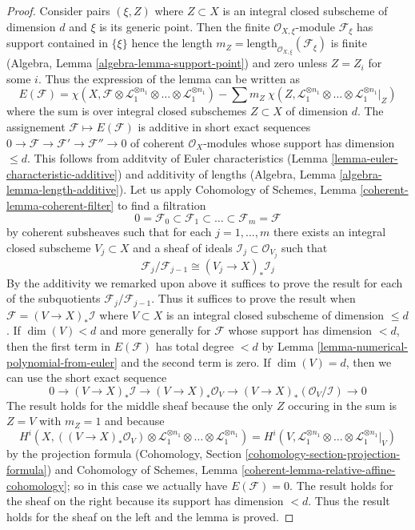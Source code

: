 \begin{proof}
Consider pairs $(\xi , Z)$ where $Z \subset X$ is an integral
closed subscheme of dimension $d$ and $\xi$ is its generic point.
Then the finite $\mathcal{O}_{X, \xi}$-module $\mathcal{F}_\xi$
has support contained in $\{\xi\}$ hence the length
$m_Z = \text{length}_{\mathcal{O}_{X, \xi}}(\mathcal{F}_\xi)$
is finite (Algebra, Lemma \ref{algebra-lemma-support-point})
and zero unless $Z = Z_i$ for some $i$. Thus the expression
of the lemma can be written as
$$
E(\mathcal{F}) =
\chi(X, \mathcal{F} \otimes \mathcal{L}_1^{\otimes n_1} \otimes \ldots \otimes
\mathcal{L}_1^{\otimes n_1}) -
\sum\nolimits
m_Z\ \chi(Z, \mathcal{L}_1^{\otimes n_1} \otimes \ldots \otimes
\mathcal{L}_1^{\otimes n_1}|_Z)
$$
where the sum is over integral closed subschemes $Z \subset X$
of dimension $d$. The assignement $\mathcal{F} \mapsto E(\mathcal{F})$
is additive in short exact sequences
$0 \to \mathcal{F} \to \mathcal{F}' \to \mathcal{F}'' \to 0$
of coherent $\mathcal{O}_X$-modules whose support has dimension
$\leq d$. This follows from additvity of Euler characteristics
(Lemma \ref{lemma-euler-characteristic-additive})
and additivity of lengths
(Algebra, Lemma \ref{algebra-lemma-length-additive}).
Let us apply Cohomology of Schemes, Lemma \ref{coherent-lemma-coherent-filter}
to find a filtration
$$
0 = \mathcal{F}_0 \subset \mathcal{F}_1 \subset
\ldots \subset \mathcal{F}_m = \mathcal{F}
$$
by coherent subsheaves such that for each $j = 1, \ldots, m$
there exists an integral closed subscheme $V_j \subset X$
and a sheaf of ideals $\mathcal{I}_j \subset \mathcal{O}_{V_j}$
such that
$$
\mathcal{F}_j/\mathcal{F}_{j - 1}
\cong (V_j \to X)_* \mathcal{I}_j
$$
By the additivity we remarked upon above it suffices to
prove the result for each of the subquotients
$\mathcal{F}_j/\mathcal{F}_{j - 1}$. Thus it suffices to prove
the result when $\mathcal{F} = (V \to X)_*\mathcal{I}$ where
$V \subset X$ is an integral closed subscheme of dimension $\leq d$.
If $\dim(V) < d$ and more generally for $\mathcal{F}$
whose support has dimension $< d$, then the first term
in $E(\mathcal{F})$ has total degree $< d$ by
Lemma \ref{lemma-numerical-polynomial-from-euler}
and the second term is zero. If $\dim(V) = d$, then we can use the
short exact sequence
$$
0 \to (V \to X)_*\mathcal{I} \to (V \to X)_*\mathcal{O}_V
\to (V \to X)_*(\mathcal{O}_V/\mathcal{I}) \to 0
$$
The result holds for the middle sheaf because
the only $Z$ occuring in the sum is $Z = V$
with $m_Z = 1$ and because
$$
H^i(X, ((V \to X)_*\mathcal{O}_V) \otimes 
 \mathcal{L}_1^{\otimes n_1} \otimes \ldots \otimes
\mathcal{L}_1^{\otimes n_1}) =
H^i(V,  \mathcal{L}_1^{\otimes n_1} \otimes \ldots \otimes
\mathcal{L}_1^{\otimes n_1}|_V)
$$
by the projection formula
(Cohomology, Section \ref{cohomology-section-projection-formula}) and
Cohomology of Schemes, Lemma
\ref{coherent-lemma-relative-affine-cohomology};
so in this case we actually have $E(\mathcal{F}) = 0$.
The result holds for the sheaf on the right because its support
has dimension $< d$. Thus the result holds for the sheaf on the
left and the lemma is proved.
\end{proof}

